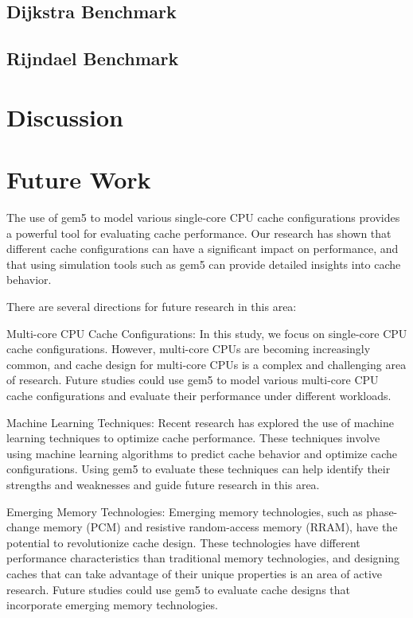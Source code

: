 \documentclass[conference]{IEEEtran}
\begin{document}
\subsection{Dijkstra Benchmark}


\subsection{Rijndael Benchmark}



\section{Discussion}


\section{Future Work}
The use of gem5 to model various single-core CPU cache configurations provides a powerful tool for evaluating cache performance. Our research has shown that different cache configurations can have a significant impact on performance, and that using simulation tools such as gem5 can provide detailed insights into cache behavior.

There are several directions for future research in this area:

Multi-core CPU Cache Configurations: In this study, we focus on single-core CPU cache configurations. However, multi-core CPUs are becoming increasingly common, and cache design for multi-core CPUs is a complex and challenging area of research. Future studies could use gem5 to model various multi-core CPU cache configurations and evaluate their performance under different workloads.

Machine Learning Techniques: Recent research has explored the use of machine learning techniques to optimize cache performance. These techniques involve using machine learning algorithms to predict cache behavior and optimize cache configurations. Using gem5 to evaluate these techniques can help identify their strengths and weaknesses and guide future research in this area.

Emerging Memory Technologies: Emerging memory technologies, such as phase-change memory (PCM) and resistive random-access memory (RRAM), have the potential to revolutionize cache design. These technologies have different performance characteristics than traditional memory technologies, and designing caches that can take advantage of their unique properties is an area of active research. Future studies could use gem5 to evaluate cache designs that incorporate emerging memory technologies.
\end{document}
